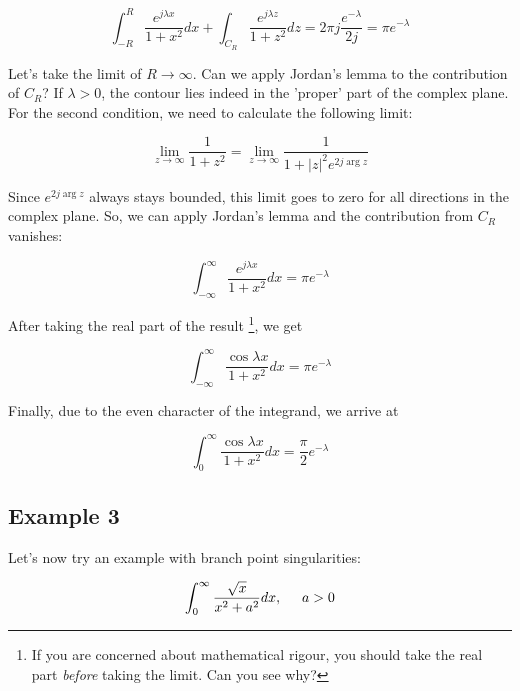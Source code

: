 \begin{equation}
\int_{-R}^{R} \frac{e^{j \lambda x}}{1 + x^2} dx + \int_{{C_R}}
\frac{e^{j \lambda z}}{1 + z^2} dz = 2 \pi j \frac{e^{-\lambda}}{2 j} = \pi
e^{-\lambda}
\end{equation}

Let's take the limit of $R \to \infty$. Can we apply Jordan's lemma to the
contribution of ${C_R}$? If $\lambda > 0$, the contour lies indeed in
the 'proper' part of the complex plane. For the second condition, we need to
calculate the following limit:

\begin{equation}
\lim_{z \to \infty}\frac{1}{1+z^2} = \lim_{z \to \infty}\frac{1}{1+|z|^2 e^{2 j
\arg z}}
\end{equation}

Since $e^{2 j \arg z}$ always stays bounded, this limit goes to zero for all
directions in the complex plane. So, we can apply Jordan's lemma and the
contribution from ${C_R}$ vanishes:

\begin{equation}
\int_{-\infty}^{\infty}\frac{e^{j \lambda x}}{1 + x^2} dx = \pi e^{-\lambda}
\end{equation}

After taking the real part of the result \footnote{If you are concerned about mathematical rigour, you should take the real part \emph{before} taking the limit. Can you see why?}, we get

\begin{equation}
\int_{-\infty}^{\infty}\frac{\cos \lambda x}{1 + x^2} dx = \pi e^{-\lambda}
\end{equation}

Finally, due to the even character of the integrand, we arrive at

\begin{equation}
\int_0^{\infty}\frac{\cos \lambda x}{1 + x^2} dx = \frac{\pi}{2} e^{-\lambda}
\end{equation}

\subsection*{Example 3}

Let's now try an example with branch point singularities:

\begin{equation}
\int_0^{\infty}\frac{\sqrt{x}}{x^2+a^2}dx, \hspace{0.5cm} a > 0
\end{equation}

